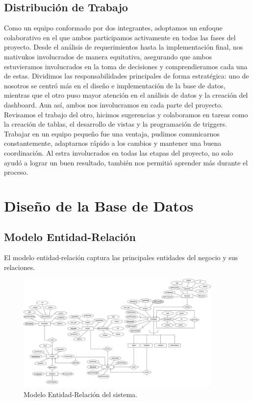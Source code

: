 \documentclass[a4paper, 12pt]{article}
\begin{document}
\subsection{Distribución de Trabajo}
    Como un equipo conformado por dos integrantes, adoptamos un enfoque colaborativo en el que ambos participamos activamente en todas las fases del proyecto.
    Desde el análisis de requerimientos hasta la implementación final, nos mativukos involucrados de manera equitativa, asegurando que ambos estuvieramos involucrados en la toma de decisiones y comprendieramos cada una de estas.
\vspace{5mm}
    Dividimos las responsabilidades principales de forma estratégica: uno de nosotros se centró más en el diseño e implementación de la base de datos, mientras que el otro puso mayor atención en el análisis de datos y la creación del dashboard. Aun así, ambos nos involucramos en cada parte del proyecto. Revisamos el trabajo del otro, hicimos sugerencias y colaboramos en tareas como la creación de tablas, el desarrollo de vistas y la programación de triggers.
\vspace{5mm}
    Trabajar en un equipo pequeño fue una ventaja, pudimos comunicarnos constantemente, adaptarnos rápido a los cambios y mantener una buena coordinación. Al estra involucrados en todas las etapas del proyecto, no solo ayudó a lograr un buen resultado, también nos permitió aprender más durante el proceso.
\newpage
\section{Diseño de la Base de Datos}
\subsection{Modelo Entidad-Relación}
El modelo entidad-relación captura las principales entidades del negocio y sus relaciones.

\begin{figure}[h]
    \centering
    \includegraphics[width=0.9\textwidth]{MER.jpg}
    \caption{Modelo Entidad-Relación del sistema.}
    \label{fig:mer}
\end{figure}
\end{document}
